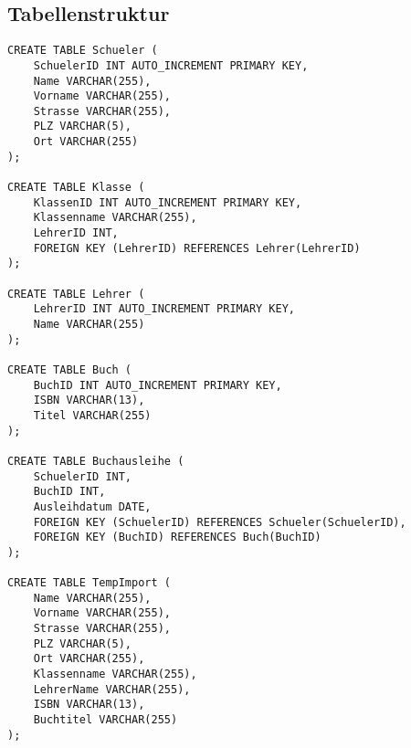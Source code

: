 \documentclass[12pt,a4paper]{article}
\begin{document}
\subsection{Tabellenstruktur}
\begin{lstlisting}
CREATE TABLE Schueler (
    SchuelerID INT AUTO_INCREMENT PRIMARY KEY,
    Name VARCHAR(255),
    Vorname VARCHAR(255),
    Strasse VARCHAR(255),
    PLZ VARCHAR(5),
    Ort VARCHAR(255)
);

CREATE TABLE Klasse (
    KlassenID INT AUTO_INCREMENT PRIMARY KEY,
    Klassenname VARCHAR(255),
    LehrerID INT,
    FOREIGN KEY (LehrerID) REFERENCES Lehrer(LehrerID)
);

CREATE TABLE Lehrer (
    LehrerID INT AUTO_INCREMENT PRIMARY KEY,
    Name VARCHAR(255)
);

CREATE TABLE Buch (
    BuchID INT AUTO_INCREMENT PRIMARY KEY,
    ISBN VARCHAR(13),
    Titel VARCHAR(255)
);

CREATE TABLE Buchausleihe (
    SchuelerID INT,
    BuchID INT,
    Ausleihdatum DATE,
    FOREIGN KEY (SchuelerID) REFERENCES Schueler(SchuelerID),
    FOREIGN KEY (BuchID) REFERENCES Buch(BuchID)
);

CREATE TABLE TempImport (
    Name VARCHAR(255),
    Vorname VARCHAR(255),
    Strasse VARCHAR(255),
    PLZ VARCHAR(5),
    Ort VARCHAR(255),
    Klassenname VARCHAR(255),
    LehrerName VARCHAR(255),
    ISBN VARCHAR(13),
    Buchtitel VARCHAR(255)
);
\end{lstlisting}

\newpage
\end{document}
